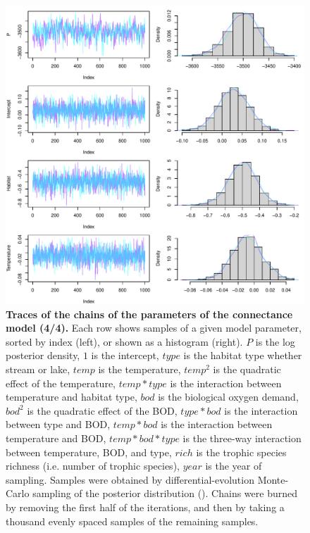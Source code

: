 \documentclass[11pt, oneside]{article}
\begin{document}
\begin{figure}[H]
\begin{center}
\includegraphics[page=4, width=1\linewidth]{b0_6_3/out_con/fig_tracePlot_beta.pdf}
\caption{
    \textbf{Traces of the chains of the parameters of the connectance model (4/4).}
    Each row shows samples of a given model parameter, sorted by index (left), or shown as a histogram (right).
    $P$ is the log posterior density, $1$ is the intercept, $type$ is the habitat type whether stream or lake, $temp$ is the temperature, $temp^2$ is the quadratic effect of the temperature, $temp * type$ is the interaction between temperature and habitat type, $bod$ is the biological oxygen demand, $bod^2$ is the quadratic effect of the BOD, $type * bod$ is the interaction between type and BOD, $temp * bod$ is the interaction between temperature and BOD, $temp * bod * type$ is the three-way interaction between temperature, BOD, and type, $rich$ is the trophic species richness (i.e. number of trophic species), $year$ is the year of sampling.
    Samples were obtained by differential-evolution Monte-Carlo sampling of the posterior distribution (\cite{TerBraak2006}).
    Chains were burned by removing the first half of the iterations, and then by taking a thousand evenly spaced samples of the remaining samples.
} 
\end{center}
\end{figure}
\end{document}
